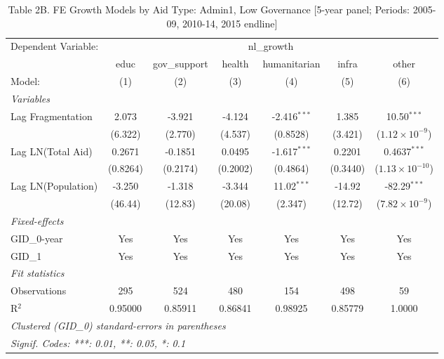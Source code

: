 
\begin{table}[H]
   \caption{Table 2B. FE Growth Models by Aid Type: Admin1, Low Governance [5-year panel; Periods: 2005-09, 2010-14, 2015 endline]}
   \centering
   \begin{tabular}{lcccccc}
      \tabularnewline \midrule \midrule
      Dependent Variable: & \multicolumn{6}{c}{nl\_growth}\\
                         & educ     & gov\_support  & health   & humanitarian   & infra    & other \\   
      Model:             & (1)      & (2)           & (3)      & (4)            & (5)      & (6)\\  
      \midrule
      \emph{Variables}\\
      Lag Fragmentation  & 2.073    & -3.921        & -4.124   & -2.416$^{***}$ & 1.385    & 10.50$^{***}$\\   
                         & (6.322)  & (2.770)       & (4.537)  & (0.8528)       & (3.421)  & ($1.12\times 10^{-9}$)\\    
      Lag LN(Total Aid)  & 0.2671   & -0.1851       & 0.0495   & -1.617$^{***}$ & 0.2201   & 0.4637$^{***}$\\   
                         & (0.8264) & (0.2174)      & (0.2002) & (0.4864)       & (0.3440) & ($1.13\times 10^{-10}$)\\    
      Lag LN(Population) & -3.250   & -1.318        & -3.344   & 11.02$^{***}$  & -14.92   & -82.29$^{***}$\\   
                         & (46.44)  & (12.83)       & (20.08)  & (2.347)        & (12.72)  & ($7.82\times 10^{-9}$)\\    
      \midrule
      \emph{Fixed-effects}\\
      GID\_0-year        & Yes      & Yes           & Yes      & Yes            & Yes      & Yes\\  
      GID\_1             & Yes      & Yes           & Yes      & Yes            & Yes      & Yes\\  
      \midrule
      \emph{Fit statistics}\\
      Observations       & 295      & 524           & 480      & 154            & 498      & 59\\  
      R$^2$              & 0.95000  & 0.85911       & 0.86841  & 0.98925        & 0.85779  & 1.0000\\  
      \midrule \midrule
      \multicolumn{7}{l}{\emph{Clustered (GID\_0) standard-errors in parentheses}}\\
      \multicolumn{7}{l}{\emph{Signif. Codes: ***: 0.01, **: 0.05, *: 0.1}}\\
   \end{tabular}
\end{table}



